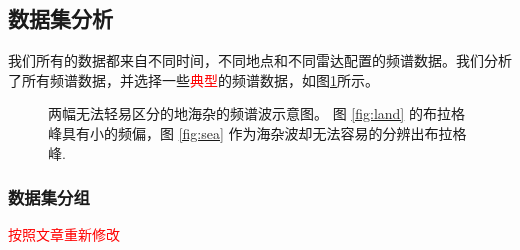 \subsection{数据集分析}
我们所有的数据都来自不同时间，不同地点和不同雷达配置的频谱数据。我们分析了所有频谱数据，并选择一些\textcolor{red}{典型}的频谱数据，如图\ref{fig:spectrum}所示。
\begin{figure}[!t]
	\centering
	\hfil
	\caption{两幅无法轻易区分的地海杂的频谱波示意图。 图 \ref{fig:land} 的布拉格峰具有小的频偏，图 \ref{fig:sea} 作为海杂波却无法容易的分辨出布拉格峰.}
	\label{fig:spectrum}
\end{figure}

\subsubsection{数据集分组}
\textcolor{red}{按照文章重新修改}

